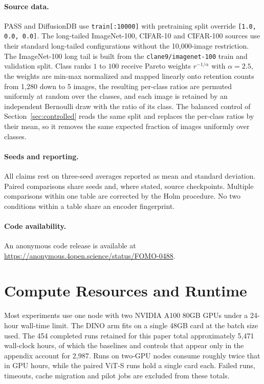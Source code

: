 \documentclass{article}
\begin{document}
\paragraph{Source data.}
PASS and DiffusionDB use \texttt{train[:10000]} with pretraining split override \texttt{[1.0, 0.0, 0.0]}. The long-tailed ImageNet-100, CIFAR-10 and CIFAR-100 sources use their standard long-tailed configurations without the 10{,}000-image restriction. The ImageNet-100 long tail is built from the \texttt{clane9/imagenet-100} train and validation split. Class ranks $1$ to $100$ receive Pareto weights $r^{-1/\alpha}$ with $\alpha=2.5$, the weights are min-max normalized and mapped linearly onto retention counts from 1{,}280 down to 5 images, the resulting per-class ratios are permuted uniformly at random over the classes, and each image is retained by an independent Bernoulli draw with the ratio of its class. The balanced control of Section~\ref{sec:controlled} reads the same split and replaces the per-class ratios by their mean, so it removes the same expected fraction of images uniformly over classes.

\paragraph{Seeds and reporting.}
All claims rest on three-seed averages reported as mean and standard deviation. Paired comparisons share seeds and, where stated, source checkpoints. Multiple comparisons within one table are corrected by the Holm procedure. No two conditions within a table share an encoder fingerprint.

\paragraph{Code availability.}
An anonymous code release is available at \url{https://anonymous.4open.science/status/FOMO-0488}.

\section{Compute Resources and Runtime}
\label{app:compute}
Most experiments use one node with two NVIDIA A100 80GB GPUs under a 24-hour wall-time limit. The DINO arm fits on a single 48GB card at the batch size used. The 454 completed runs retained for this paper total approximately 5{,}471 wall-clock hours, of which the baselines and controls that appear only in the appendix account for 2{,}987. Runs on two-GPU nodes consume roughly twice that in GPU hours, while the paired ViT-S runs hold a single card each. Failed runs, timeouts, cache migration and pilot jobs are excluded from these totals.
\end{document}
